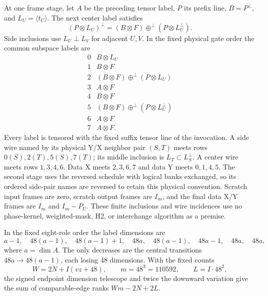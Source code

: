 At one frame stage, let $A$ be the preceding tensor label, $P$ its
prefix line, $B=P^\perp$, and $L_U=\langle t_U\rangle$.  The next center
label satisfies
\[
 (P\otimes L_U)^\perp
   =(B\otimes F)\oplus^\perp(P\otimes L_U^\perp).
\]
Side inclusions use $L_U\perp L_V$ for adjacent $U,V$.  In the fixed
physical gate order the common subspace labels are
\[
\begin{array}{c|l}
0&B\otimes L_U\\
1&B\otimes F\\
2&(B\otimes F)\oplus^\perp(P\otimes L_U)\\
3&A\otimes F\\
4&B\otimes F\\
5&(B\otimes F)\oplus^\perp(P\otimes L_U^\perp)\\
6&A\otimes F\\
7&A\otimes F.
\end{array}
\]
Every label is tensored with the fixed suffix tensor line of the
invocation. A side wire named by its physical Y/X neighbor pair $(S,T)$
meets rows $0(S),2(T),5(S),7(T)$; its middle inclusion is
$L_T\subset L_S^\perp$. A center wire meets rows $1,3,4,6$.
Data X meets $2,3,6,7$ and data Y meets $0,1,4,5$.
The second stage uses the reversed schedule with logical banks exchanged,
so its ordered side-pair names are reversed to retain this physical
convention. Scratch input frames are zero, scratch output frames are
$I_m$, and the final data X/Y frames are $I_m$ and $I_m-P_U$.
These finite inclusions and wire incidences use no phase-kernel,
weighted-mask, H2, or interchange algorithm as a premise.

In the fixed
eight-role order the label dimensions are
\[
 a-1,\quad 48(a-1),\quad48(a-1)+1,\quad48a,\quad
 48(a-1),\quad48a-1,\quad48a,\quad48a,
\]
where $a=\dim A$.  The only decreases are the central transitions
$48a\to48(a-1)$, each losing 48 dimensions.  With the fixed counts
\[
 W=2N+I(vz+48),\qquad m=48^3=110592,
 \qquad L=I\cdot48^2,
\]
the signed endpoint dimension telescope and twice the downward variation
give the sum of comparable-edge ranks $Wm-2N+2L$.

